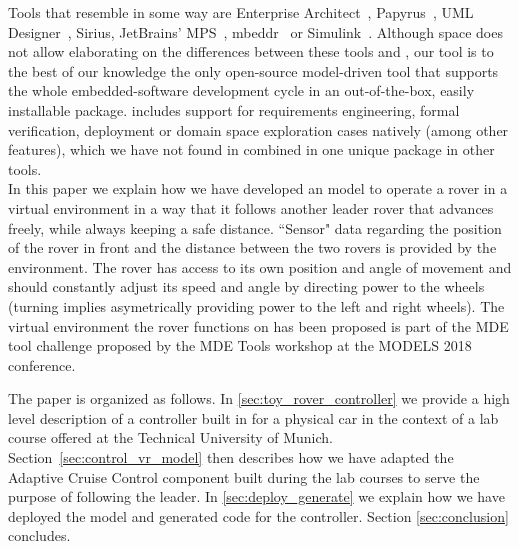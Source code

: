 Tools that resemble \af in some way are Enterprise
Architect~\cite{SparxSystems}, Papyrus~\cite{Papyrus}, UML Designer~\cite{UMLDesigner}, Sirius\cite{Sirius}, JetBrains' MPS~\cite{MPS},
mbeddr~\cite{mbeddr} or Simulink~\cite{simulink}. Although space does not allow elaborating on the
differences between these tools and \af, our tool is to the best of our knowledge the
only open-source model-driven tool that supports the whole embedded-software development
cycle in an out-of-the-box, easily installable package. \af includes support
for requirements engineering, formal verification, deployment or domain space
exploration cases natively (among other features), which we have not found in
combined in one unique package in other tools.\\

In this paper we explain how we have developed an \af model to operate a rover
in a virtual environment in a way that it follows another leader rover that
advances freely, while always keeping a safe distance. ``Sensor" data regarding
the position of the rover in front and the distance between the two rovers is
provided by the environment. The rover has access to its own position and angle
of movement and should constantly adjust its speed and angle by directing power
to the wheels (turning implies asymetrically providing power to the left and
right wheels). The virtual environment the rover functions on has been proposed
is part of the MDE tool challenge proposed by the MDE Tools workshop at the
MODELS 2018 conference.

The paper is organized as follows. In \sect\ref{sec:toy_rover_controller} we
provide a high level description of a controller built in \af for a physical car in the
context of a lab course offered at the Technical University of Munich.
Section~\ref {sec:control_vr_model} then describes how we have adapted the
Adaptive Cruise Control component built during the lab courses to serve the
purpose of following the leader. In \sect\ref{sec:deploy_generate} we explain
how we have deployed the model and generated \clang code for the controller. Section
\sect\ref{sec:conclusion} concludes.
